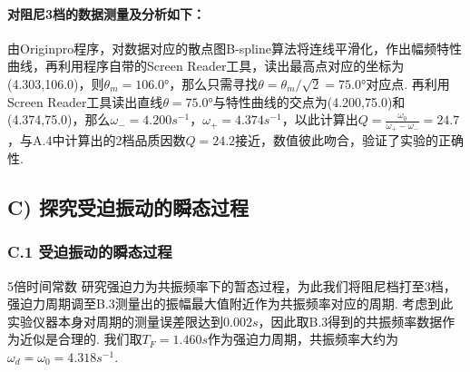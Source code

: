 \documentclass[UTF8]{ctexart}
\begin{document}
\paragraph{对阻尼3档的数据测量及分析如下：}\quad \par

\begin{figure}[H]\end{figure}

由Originpro程序，对数据对应的散点图B-spline算法将连线平滑化，作出幅频特性曲线，再利用程序自带的Screen Reader工具，读出最高点对应的坐标为(4.303,106.0)，则$\theta_m=106.0$°，那么只需寻找$\theta=\theta_m/\sqrt2=75.0$°对应点. 再利用Screen Reader工具读出直线$\theta=75.0$°与特性曲线的交点为(4.200,75.0)和(4.374,75.0)，那么$\omega_{-}=4.200s^{-1}$，$\omega_{+}=4.374s^{-1}$，以此计算出$\displaystyle{Q=\frac{\omega_0}{\omega_{+}-\omega_{-}}=24.7}$，与A.4中计算出的2档品质因数$Q=24.2$接近，数值彼此吻合，验证了实验的正确性.

\subsection*{ C) 探究受迫振动的瞬态过程}
\subsubsection*{C.1 受迫振动的瞬态过程}
5倍时间常数
研究强迫力为共振频率下的暂态过程，为此我们将阻尼档打至3档，强迫力周期调至B.3测量出的振幅最大值附近作为共振频率对应的周期. 考虑到此实验仪器本身对周期的测量误差限达到$0.002s$，因此取B.3得到的共振频率数据作为近似是合理的. 我们取$T_F=1.460s$作为强迫力周期，共振频率大约为$\omega_d=\omega_0=4.318s^{-1}$.\par
\end{document}
